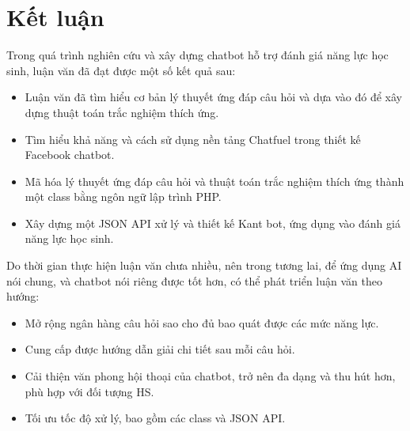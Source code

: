 \chapter*{Kết luận}

Trong quá trình nghiên cứu và xây dựng chatbot hỗ trợ đánh giá năng lực học sinh, luận văn đã đạt được một số kết quả sau: \begin{itemize}
	\item Luận văn đã tìm hiểu cơ bản lý thuyết ứng đáp câu hỏi và dựa vào đó để xây dựng thuật toán trắc nghiệm thích ứng.
	\item Tìm hiểu khả năng và cách sử dụng nền tảng Chatfuel trong thiết kế Facebook chatbot.
	\item Mã hóa lý thuyết ứng đáp câu hỏi và thuật toán trắc nghiệm thích ứng thành một class bằng ngôn ngữ lập trình PHP.
	\item Xây dựng một JSON API xử lý và thiết kế Kant bot, ứng dụng vào đánh giá năng lực học sinh.
\end{itemize}

Do thời gian thực hiện luận văn chưa nhiều, nên trong tương lai, để ứng dụng AI nói chung, và chatbot nói riêng được tốt hơn, có thể phát triển luận văn theo hướng: \begin{itemize}
	\item Mở rộng ngân hàng câu hỏi sao cho đủ bao quát được các mức năng lực.
	\item Cung cấp được hướng dẫn giải chi tiết sau mỗi câu hỏi.
	\item Cải thiện văn phong hội thoại của chatbot, trở nên đa dạng và thu hút hơn, phù hợp với đối tượng HS.
	\item Tối ưu tốc độ xử lý, bao gồm các class và JSON API.
\end{itemize}
